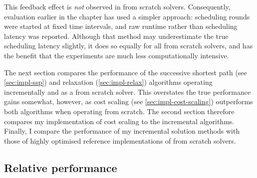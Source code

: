 This feedback effect is \emph{not} observed in from scratch solvers. Consequently, evaluation earlier in the chapter has used a simpler approach: scheduling rounds were started at fixed time intervals, and raw runtime rather than scheduling latency was reported. Although that method may underestimate the true scheduling latency slightly\footnotemark, it does so equally for all from scratch solvers, and has the benefit that the experiments are much less computationally intensive.

The next section compares the performance of the successive shortest path (see \cref{sec:impl-ssp}) and relaxation (\cref{sec:impl-relax}) algorithms operating incrementally and as a from scratch solver. This overstates the true performance gains somewhat, however, as cost scaling (see \cref{sec:impl-cost-scaling}) outperforms both algorithms when operating from scratch. The second section therefore compares my implementation of cost scaling to the incremental algorithms. Finally, I compare the performance of my incremental solution methods with those of highly optimised reference implementations of from scratch solvers.

\subsection{Relative performance}


